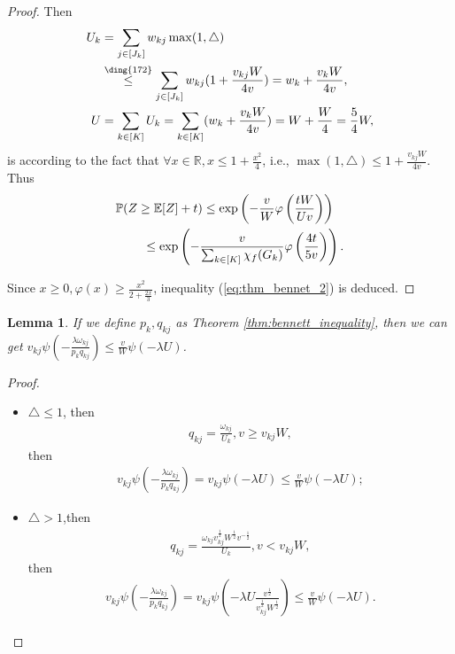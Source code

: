 \documentclass{article}
\def\sR{\mathbb{R}}
\def\eE{\mathbb{E}}
\def\pP{\mathbb{P}}
\def\leqone{\overset{\text{\ding{172}}}{\leq}}
\newtheorem{lemma}{Lemma}
\begin{document}
\begin{proof}
Then
\begin{align*}
    U_k & =  \sum _{j \in [J_k]} w_{kj} \max (1, \triangle) \\
    & \leqone \sum _{j \in [J_k]} w_{kj} (1 + \frac{v_{kj} W}{4 v}) 
     = w_k + \frac{v_k W}{4v}, \\
    U & = \sum _{k \in [K]} U_k 
     = \sum _{k \in [K]} (w_k + \frac{v_k W}{4v}) 
     = W + \frac{W}{4} = \frac{5}{4}W,
\end{align*}
 is according to the fact that $\forall x \in \sR,x \leq 1 + \frac{x^2}{4}$, i.e., $\max (1, \triangle) \leq 1 + \frac{v_{kj} W}{4v}$. Thus
\begin{align*}
    \pP (Z \geq \eE[Z] & + t) \leq \exp \left( -\frac{v}{W} \varphi \left( \frac{tW}{Uv}\right) \right) \notag \\
                    \leq \exp & \left( - \frac{v}{ \sum_{k \in [K]} \chi_{f} (G_k)} \varphi \left( \frac{4t}{5v}\right) \right).
\end{align*}

Since $x \geq 0, \varphi (x) \geq \frac{x^2}{2+\frac{2x}{3} } $, inequality (\eqref{eq:thm_bennet_2}) is deduced.   
\end{proof}
\begin{lemma}
    \label{pro: inequality technique} If we define $p_k, q_{kj}$ as Theorem \ref{thm:bennett_inequality}, then we can get $v_{kj} \psi(-\frac{\lambda \omega_{kj}}{p_k q_{kj}} ) \leq \frac{v}{W} \psi(-\lambda U )$.    
\end{lemma}
\begin{proof}
   \begin{itemize}
    \item $\triangle \leq  1$, then 
 \begin{align*}
     q_{kj} = \frac{\omega_{kj}}{U_k}, v \geq v_{kj} W,
 \end{align*}
 then 
 \begin{align*}
     v_{kj} \psi (-\frac{\lambda \omega_{kj}}{p_k q_{kj}}) = v_{kj} \psi (- \lambda U) \leq \frac{v}{W} \psi (- \lambda U);
 \end{align*}
 \item $\triangle > 1$,then
 \begin{align*}
     q_{kj} = \frac{\omega_{kj} v_{kj}^{\frac{1}{2}} W^{\frac{1}{2}} v^{- \frac{1}{2}} }{U_k}, v < v_{kj} W,
 \end{align*}
then
\begin{align*}
    v_{kj} \psi (-\frac{\lambda \omega_{kj}}{p_k q_{kj}}) = v_{kj} \psi (- \lambda U \frac{v^{\frac{1}{2}}}{v_{kj}^{\frac{1}{2}} W^{\frac{1}{2}} }) \leq \frac{v}{W} \psi(-\lambda U).
\end{align*}
 
\end{itemize} 
\end{proof}
\end{document}
